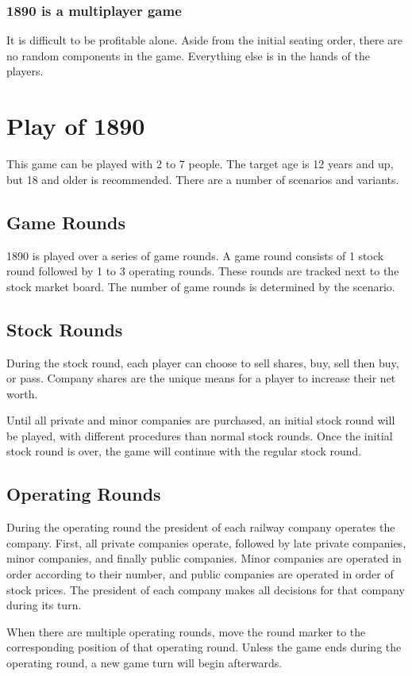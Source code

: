 \documentclass{article}
\begin{document}
\begin{CJK}{UTF8}{min}
\begin{multicols}{2}
\subsubsection*{1890 is a multiplayer game}
It is difficult to be profitable alone. Aside from the initial seating
order, there are no random components in the game. Everything else is
in the hands of the players.

\section{Play of 1890}
This game can be played with 2 to 7 people. The target age is 12 years
and up, but 18 and older is recommended. There are a number of
scenarios and variants.

\subsection{Game Rounds}
1890 is played over a series of game rounds. A game round consists of
1 stock round followed by 1 to 3 operating rounds. These rounds are
tracked next to the stock market board. The number of game rounds is
determined by the scenario.

\subsection{Stock Rounds}
During the stock round, each player can choose to sell
shares, buy, sell then buy, or pass. Company shares are the unique
means for a player to increase their net worth.

Until all private and minor companies are purchased, an initial stock
round will be played, with different procedures than normal stock
rounds. Once the initial stock round is over, the game will continue with
the regular stock round.

\subsection{Operating Rounds}
During the operating round the president of each railway company
operates the company. First, all private companies operate, followed
by late private companies, minor companies, and finally public
companies. Minor companies are operated in order according to their
number, and public companies are operated in order of stock
prices. The president of each company makes all decisions for that
company during its turn.

When there are multiple operating rounds, move the round marker to the
corresponding position of that operating round. Unless the game ends during
the operating round, a new game turn will begin afterwards.



\end{multicols}
\end{CJK}
\end{document}

